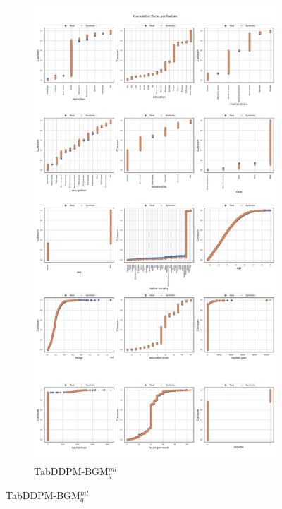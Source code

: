 \newpage
\begin{landscape}
	\begin{figure}[h]
		\centering
		\hfill
		\begin{subfigure}{0.3\linewidth}
			\includegraphics[height=\textheight,width=\linewidth,keepaspectratio]{images/cumsums/tab-ddpm-bgm.jpg}
			\caption{TabDDPM-BGM$^{ml}_q$}
		\end{subfigure}

\end{figure}
\end{landscape}
